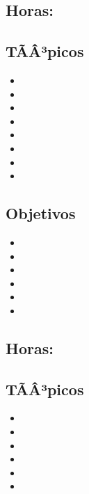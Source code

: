 \subsection*{Horas: \NCDOSHours}

\subsection*{TÃÂ³picos}
\begin{itemize}
	\item \NCDOSTopicEstandares
	\item \NCDOSTopicEl
	\item \NCDOSTopicConmutacion
	\item \NCDOSTopicFlujos
	\item \NCDOSTopicConceptos
	\item \NCDOSTopicConceptosde
	\item \NCDOSTopicTrabajo
	\item \NCDOSTopicServicios
\end{itemize}

\subsection*{Objetivos}
\begin{itemize}
	\item \NCDOSObjUNO
	\item \NCDOSObjDOS
	\item \NCDOSObjTRES
	\item \NCDOSObjCUATRO
	\item \NCDOSObjCINCO
	\item \NCDOSObjSEIS
\end{itemize}

\subsection{\NCTRESDef}\label{sec:BOK-NC3}
\subsection*{Horas: \NCTRESHours}

\subsection*{TÃÂ³picos}
\begin{itemize}
	\item \NCTRESTopicFundamentos
	\item \NCTRESTopicAlgoritmos
	\item \NCTRESTopicAlgoritmosde
	\item \NCTRESTopicAutenticacion
	\item \NCTRESTopicFirmas
	\item \NCTRESTopicEjemplos
\end{itemize}

